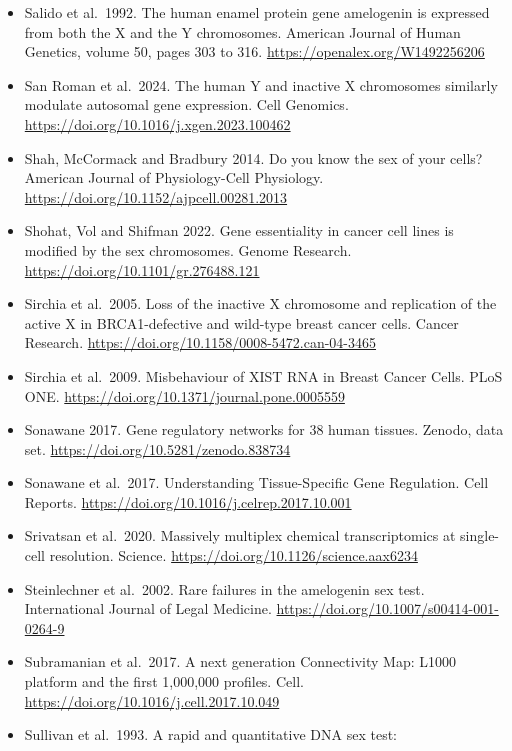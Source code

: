 \documentclass[
  11pt,
  letterpaper,
]{article}
\begin{document}
\begin{itemize}
  Saha et al.~2024. Gene regulatory networks reveal sex difference in
  lung adenocarcinoma. Biology of Sex Differences.
  \url{https://doi.org/10.1186/s13293-024-00634-y}
\item
  Salido et al.~1992. The human enamel protein gene amelogenin is
  expressed from both the X and the Y chromosomes. American Journal of
  Human Genetics, volume 50, pages 303 to 316.
  \url{https://openalex.org/W1492256206}
\item
  San Roman et al.~2024. The human Y and inactive X chromosomes
  similarly modulate autosomal gene expression. Cell Genomics.
  \url{https://doi.org/10.1016/j.xgen.2023.100462}
\item
  Shah, McCormack and Bradbury 2014. Do you know the sex of your cells?
  American Journal of Physiology-Cell Physiology.
  \url{https://doi.org/10.1152/ajpcell.00281.2013}
\item
  Shohat, Vol and Shifman 2022. Gene essentiality in cancer cell lines
  is modified by the sex chromosomes. Genome Research.
  \url{https://doi.org/10.1101/gr.276488.121}
\item
  Sirchia et al.~2005. Loss of the inactive X chromosome and replication
  of the active X in BRCA1-defective and wild-type breast cancer cells.
  Cancer Research. \url{https://doi.org/10.1158/0008-5472.can-04-3465}
\item
  Sirchia et al.~2009. Misbehaviour of XIST RNA in Breast Cancer Cells.
  PLoS ONE. \url{https://doi.org/10.1371/journal.pone.0005559}
\item
  Sonawane 2017. Gene regulatory networks for 38 human tissues. Zenodo,
  data set. \url{https://doi.org/10.5281/zenodo.838734}
\item
  Sonawane et al.~2017. Understanding Tissue-Specific Gene Regulation.
  Cell Reports. \url{https://doi.org/10.1016/j.celrep.2017.10.001}
\item
  Srivatsan et al.~2020. Massively multiplex chemical transcriptomics at
  single-cell resolution. Science.
  \url{https://doi.org/10.1126/science.aax6234}
\item
  Steinlechner et al.~2002. Rare failures in the amelogenin sex test.
  International Journal of Legal Medicine.
  \url{https://doi.org/10.1007/s00414-001-0264-9}
\item
  Subramanian et al.~2017. A next generation Connectivity Map: L1000
  platform and the first 1,000,000 profiles. Cell.
  \url{https://doi.org/10.1016/j.cell.2017.10.049}
\item
  Sullivan et al.~1993. A rapid and quantitative DNA sex test:

\end{itemize}
\end{document}

